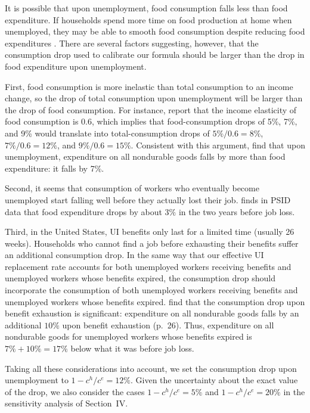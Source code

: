 \documentclass[letterpaper,12pt,leqno]{article}
\begin{document}
It is possible that upon unemployment, food consumption falls less than food expenditure. If households spend more time on food production at home when unemployed, they may be able to smooth food consumption despite reducing food expenditures \citep{AH05}. There are several factors suggesting, however, that the consumption drop used to calibrate our formula should be larger than the drop in food expenditure upon unemployment.

First, food consumption is more inelastic than total consumption to an income change, so the drop of total consumption upon unemployment will be larger than the drop of food consumption. For instance, \citet[p.~19]{BC01} report that the income elasticity of food consumption is 0.6, which implies that food-consumption drops of 5\%, 7\%, and 9\% would translate into total-consumption drops of $5\%/0.6=8\%$, $7\%/0.6=12\%$, and $9\%/0.6=15\%$. Consistent with this argument, \citet[Table~6, column~(3)]{GN15} find that upon unemployment, expenditure on all nondurable goods falls by more than food expenditure: it falls by 7\%.

Second, it seems that consumption of workers who eventually become unemployed start falling well before they actually lost their job. \citet[p.~1792]{H16} finds in PSID data that food expenditure drops by about $3\%$ in the two years before job loss.

Third, in the United States, UI benefits only last for a limited time (usually 26 weeks). Households who cannot find a job before exhausting their benefits suffer an additional consumption drop. In the same way that our effective UI replacement rate accounts for both unemployed workers receiving benefits and unemployed workers whose benefits expired, the consumption drop should incorporate the consumption of both unemployed workers receiving benefits and unemployed workers whose benefits expired. \citet{GN15} find that the consumption drop upon benefit exhaustion is significant: expenditure on all nondurable goods falls by an additional $10\%$ upon benefit exhaustion (p.~26). Thus, expenditure on all nondurable goods for unemployed workers whose benefits expired is $7\%+10\%=17\%$ below what it was before job loss.

Taking all these considerations into account, we set the consumption drop upon unemployment to $1-c^{h}/c^{e}=12\%$. Given the uncertainty about the exact value of the drop, we also consider the cases $1-c^{h}/c^{e}=5\%$ and $1-c^{h}/c^{e}=20\%$ in the sensitivity analysis of Section~IV.
\end{document}

